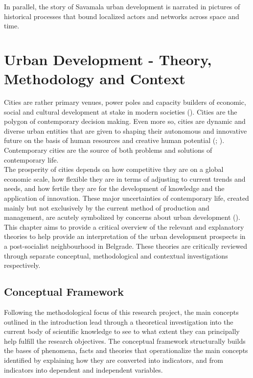 \documentclass[11pt]{report}
\begin{document}
{{In parallel, the story of Savamala urban development is narrated in pictures of historical processes that bound localized actors and networks across space and time.



\chapter{Urban Development - Theory, Methodology and Context}


Cities are rather primary venues, power poles and capacity builders of economic, social and cultural development at stake in modern societies (\href{ref}{\citealt{castells_urban_1979}}).
Cities are the polygon of contemporary decision making.
Even more so, cities are dynamic and diverse urban entities that are given to shaping their autonomous and innovative future on the basis of human resources and creative human potential (\href{ref}{\citealt{knight_cities_1989}}; \href{ref}{\citealt{yigitcanlar_knowledge-based_2008}}).
Contemporary cities are the source of both problems and solutions of contemporary life.
\\

The prosperity of cities depends on how competitive they are on a global economic scale, how flexible they are in terms of adjusting to current trends and needs, and how fertile they are for the development of knowledge and the application of innovation. These major uncertainties of contemporary life, created mainly but not exclusively by the current method of production and management, are acutely symbolized by concerns about urban development (\href{ref}{\citealt{healey_collaborative_1997}}).
\\

This chapter aims to provide a critical overview of the relevant and explanatory theories to help provide an interpretation of the urban development prospects in a post-socialist neighbourhood in Belgrade. These theories are critically reviewed through separate conceptual, methodological and contextual investigations respectively.

\section{Conceptual Framework}

Following the methodological focus of this research project, the main concepts outlined in the introduction lead through a theoretical investigation into the current body of scientific knowledge to see to what extent they can principally help fulfill the research objectives. The conceptual framework structurally builds the bases of phenomena, facts and theories that operationalize the main concepts identified by explaining how they are converted into indicators, and from indicators into dependent and independent variables.
\\

}}
\end{document}
